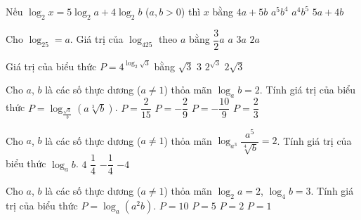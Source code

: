 \begin{ex}%
	Nếu $\log_2x=5\log_2a+4\log_2b$ ($ a,b > 0$) thì $ x$ bằng
	\choice
	{$ 4a+5b$}
	{\True $a^5b^4$}
	{$a^4b^5$}
	{$ 5a+4b$}
\end{ex}
\begin{ex}%
	Cho $\log_25=a$. Giá trị của $\log_425$ theo $ a$ bằng
	\choice
	{$\dfrac{3}{2}a$}
	{\True $a$}
	{$ 3a$}
	{$ 2a$}
\end{ex}
\begin{ex}%
	Giá trị của biểu thức $P=4^{\log_2 \sqrt{3}}$ bằng
	\choice
	{$\sqrt{3}$}
	{\True $3$}
	{$2^{\sqrt{3}}$}
	{$2\sqrt{3}$}
\end{ex}
\begin{ex}%
	Cho $a$, $b$ là các số thực dương ($ a\ne 1$) thỏa mãn $\log_a b=2$. Tính giá trị của biểu thức 
	$P=\log_{\frac{\sqrt{a}}{b}}\left( a\sqrt[3]{b}\right)$.
	\choice
	{$P=\dfrac{2}{15}$}
	{$P=-\dfrac{2}{9}$}
	{\True $P=-\dfrac{10}{9}$}
	{$P=\dfrac{2}{3}$}
\end{ex}
\begin{ex}%
	Cho $a$, $b$ là các số thực dương ($ a\ne 1$) thỏa mãn $\log_{a^3} \dfrac{a^5}{\sqrt[4]{b}}=2$. Tính giá trị của biểu thức $\log_a b$.
	\choice
	{$4$}
	{$\dfrac{1}{4}$}
	{$-\dfrac{1}{4}$}
	{\True $-4$}
\end{ex}
\begin{ex}%
	Cho $a$, $b$ là các số thực dương ($ a\ne 1$) thỏa mãn $\log_2{a}=2$, $ \log_4 b=3$. Tính giá trị của biểu thức $P=\log_a (a^2b)$.
	\choice
	{$P=10$}
	{\True $P=5$}
	{$P=2$}
	{$P=1$}
\end{ex}

